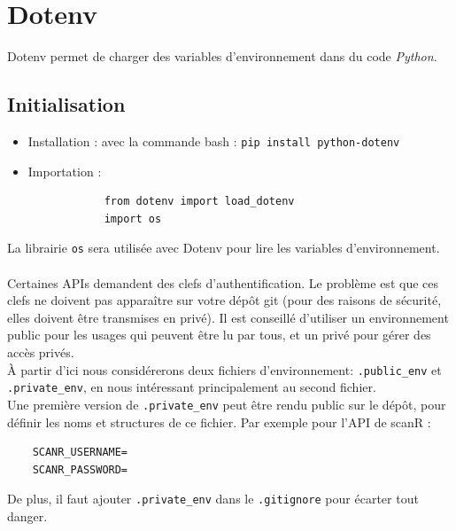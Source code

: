 \documentclass[12pt]{article}
\begin{document}
\section{Dotenv}
Dotenv permet de charger des variables d'environnement dans du code \textit{Python}.

\subsection{Initialisation}
\begin{itemize}
    \item Installation : avec la commande bash : \texttt{pip install python-dotenv}
    \item Importation :
        \begin{verbatim}
            from dotenv import load_dotenv
            import os
        \end{verbatim}
\end{itemize}

La librairie \texttt{os} sera utilisée avec Dotenv pour lire les variables d'environnement.
\\
\\Certaines APIs demandent des clefs d'authentification.
Le problème est que ces clefs ne doivent pas apparaître sur votre dépôt git (pour des raisons de sécurité, elles doivent être transmises en privé).
Il est conseillé d'utiliser un environnement public pour les usages qui peuvent être lu par tous, et un privé pour gérer des accès privés.
\\À partir d'ici nous considérerons deux fichiers d'environnement: \texttt{.public\_env} et \texttt{.private\_env}, en nous intéressant principalement au second fichier.
\\Une première version de \texttt{.private\_env} peut être rendu public sur le dépôt, pour définir les noms et structures de ce fichier. 
Par exemple pour l'API de scanR :
\begin{verbatim}
    SCANR_USERNAME=
    SCANR_PASSWORD=
\end{verbatim}
De plus, il faut ajouter \texttt{.private\_env} dans le \texttt{.gitignore} pour écarter tout danger.
\end{document}
